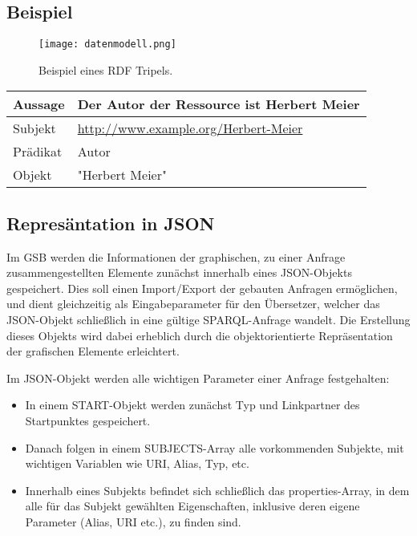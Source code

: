 \subsection*{Beispiel}
\Hack{\enlargethispage{\baselineskip}}
\begin{SCfigure}[20][htbp]%
\texttt{[image: datenmodell.png]}
\caption{Beispiel eines RDF Tripels.}\label{fig03}
\end{SCfigure}
\begin{center}

\begin{tabular}{l l}\toprule
Aussage  & Der Autor der Ressource ist Herbert Meier \\\midrule
Subjekt  & \url{http://www.example.org/Herbert-Meier} \\
Prädikat & Autor \\
Objekt   & "Herbert Meier" \\\bottomrule
\end{tabular}
\end{center}



\subsection*{Represäntation in JSON}

Im GSB werden die Informationen der graphischen, zu einer Anfrage
zusammengestellten Elemente zunächst innerhalb eines JSON-Objekts
gespeichert.
Dies soll einen Import/Export der gebauten Anfragen ermöglichen, und
dient gleichzeitig als Eingabeparameter für den Übersetzer, welcher
das JSON-Objekt schließlich in eine gültige SPARQL-Anfrage wandelt.
Die Erstellung dieses Objekts wird dabei erheblich durch die objektorientierte Repräsentation der grafischen Elemente erleichtert.

Im JSON-Objekt werden alle wichtigen Parameter einer Anfrage
festgehalten:
\begin{itemize}
\item In einem START-Objekt werden zunächst Typ und Linkpartner des
Startpunktes gespeichert. 
\item Danach folgen in einem SUBJECTS-Array alle vorkommenden
  Subjekte, mit wichtigen Variablen wie URI, Alias, Typ, etc. 
\item Innerhalb eines Subjekts befindet sich schließlich das properties-Array, in dem alle für das Subjekt gewählten Eigenschaften, inklusive deren eigene Parameter (Alias, URI etc.), zu finden sind.
\end{itemize}

